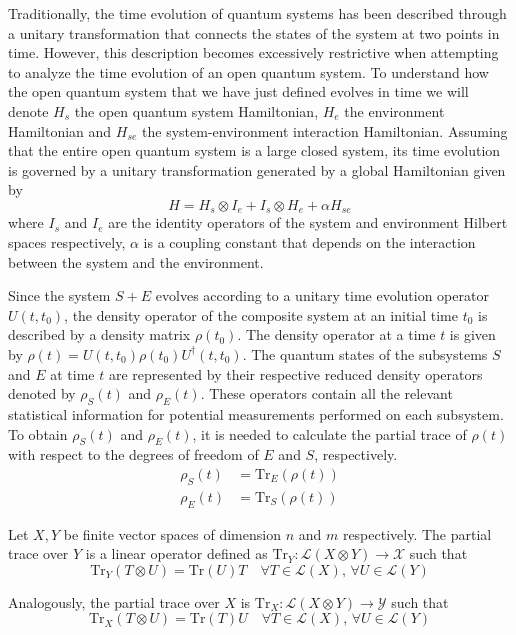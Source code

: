 Traditionally, the time evolution of quantum systems has been described through a unitary transformation that connects the states of the system at two points in time. However, this description becomes excessively restrictive when attempting to analyze the time evolution of an open quantum system. To understand how the open quantum system that we have just defined evolves in time we will denote $H_s$ the open quantum system Hamiltonian, $H_e$ the environment Hamiltonian and $H_{se}$ the system-environment interaction Hamiltonian. Assuming that the entire open quantum system is a large closed system, its time evolution is governed by a unitary transformation generated by a global Hamiltonian given by
$$H = H_s \otimes I_e + I_s \otimes H_e + \alpha H_{se}$$
where $I_s$ and $I_e$ are the identity operators of the system and environment Hilbert spaces respectively, $\alpha$ is a coupling constant that depends on the interaction between the system and the environment. 

Since the system $S+E$ evolves according to a unitary time evolution operator $U(t,t_0)$, the density operator of the composite system at an initial time $t_0$ is described by a density matrix $\rho(t_0)$. The density operator at a time $t$ is given by $\rho(t)=U(t,t_0)\rho(t_0) U^{\dag}(t,t_0)$. The quantum states of the subsystems $S$ and $E$ at time $t$ are represented by their respective reduced density operators denoted by $\rho_S(t)$ and $\rho_E(t)$. These operators contain all the relevant statistical information for potential measurements performed on each subsystem. To obtain $\rho_S(t)$ and $\rho_E(t)$, it is needed to calculate the partial trace of $\rho(t)$ with respect to the degrees of freedom of $E$ and $S$, respectively.
\begin{align}
    \rho_S(t) &= \mathrm{Tr}_E(\rho(t)) \\
    \rho_E(t) &= \mathrm{Tr}_S(\rho(t))
\end{align}

\begin{definicion}
    Let $X,Y$ be finite vector spaces of dimension $n$ and $m$ respectively. The partial trace over $Y$ is a linear operator defined as $\mathrm{Tr}_Y: \mathcal{L}(X \otimes Y) \longrightarrow \mathcal{X} $ such that
    $$\mathrm{Tr}_Y(T \otimes U) = \mathrm{Tr}(U) T \quad \forall T \in \mathcal{L}(X), \, \forall U \in \mathcal{L}(Y) $$

    Analogously, the partial trace over $X$ is $\mathrm{Tr}_X: \mathcal{L}(X \otimes Y) \longrightarrow \mathcal{Y} $ such that
    $$\mathrm{Tr}_X(T \otimes U) = \mathrm{Tr}(T) U \quad \forall T \in \mathcal{L}(X), \, \forall U \in \mathcal{L}(Y) $$
\end{definicion}

